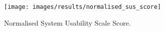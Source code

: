 
\begin{figure}[H]
	\centering
    \texttt{[image: images/results/normalised\_sus\_score]}
    \caption{Normalised System Usability Scale Score.}
    \label{fig:normalised_sus_score}
\end{figure}
